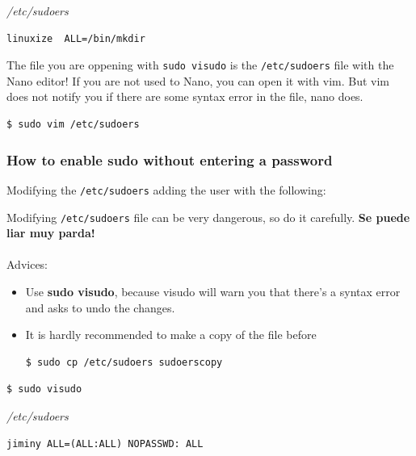 \documentclass{article}
\newenvironment{blocktemplate}[1]{%
    \tcolorbox[beamer,%
    noparskip,breakable,
    colframe=Blue,%
    colbacklower=LimeGreen!75!LightGreen,%
    title=#1]}%
    {\endtcolorbox}
\newenvironment{blocktemplateIII}[1]{%
    \tcolorbox[beamer,%
    noparskip,breakable,
    ,colframe=Red,%
    colbacklower=LimeGreen!75!LightGreen,%
    title=#1]}%
    {\endtcolorbox}
\newenvironment{codetemplate}[1][]{%
  \mybasecolorbox[#1]
  \itshape
}{%
  \endmybasecolorbox
}
\begin{document}
\begin{codetemplate}{/etc/sudoers}
\begin{verbatim}
linuxize  ALL=/bin/mkdir
\end{verbatim}
\end{codetemplate}

\begin{blocktemplate}{NOTE}
The file you are oppening with \verb|sudo visudo| is the \verb|/etc/sudoers| file with the Nano editor! If you are not used to Nano, you can open it with vim. But vim does not notify you if there are some syntax error in the file, nano does.
\begin{codetemplate}{}
\begin{verbatim}
$ sudo vim /etc/sudoers
\end{verbatim}
\end{codetemplate}
\end{blocktemplate}

\subsubsection{How to enable sudo without entering a password}
Modifying the \verb|/etc/sudoers| adding the user with the following:

\begin{blocktemplateIII}{WARNING}
Modifying \verb|/etc/sudoers| file can be very dangerous, so do it carefully. \textbf{Se puede liar muy parda!}
\\\\
Advices:
\begin{itemize}
    \item Use \textbf{sudo visudo}, because visudo will warn you that there’s a syntax error and asks to undo the changes.
    \item It is hardly recommended to make a copy of the file before
\begin{codetemplate}{}
\begin{verbatim}
$ sudo cp /etc/sudoers sudoerscopy
\end{verbatim}
\end{codetemplate}
\end{itemize}
\end{blocktemplateIII}

\begin{codetemplate}{}
\begin{verbatim}
$ sudo visudo
\end{verbatim}
\end{codetemplate}
\begin{codetemplate}{/etc/sudoers}
\begin{verbatim}
jiminy ALL=(ALL:ALL) NOPASSWD: ALL
\end{verbatim}
\end{codetemplate}
\end{document}
